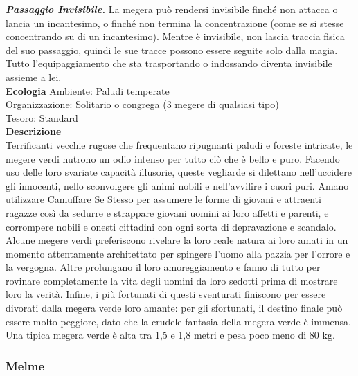 \begin{multicols}{2}
\emph{\textbf{Passaggio Invisibile.}} La megera può rendersi invisibile finché non attacca o lancia un incantesimo, o finché non termina la concentrazione (come se si stesse concentrando su di un incantesimo). Mentre è invisibile, non lascia traccia fisica del suo passaggio, quindi le sue tracce possono essere seguite solo dalla magia. Tutto l'equipaggiamento che sta trasportando o  indossando diventa invisibile assieme a lei.\\
\textbf{Ecologia}
Ambiente: Paludi temperate\\
Organizzazione: Solitario o congrega (3 megere di qualsiasi tipo)\\
Tesoro: Standard\\
\textbf{Descrizione}\\
Terrificanti vecchie rugose che frequentano ripugnanti paludi e foreste intricate, le megere verdi nutrono un odio intenso per tutto ciò che è bello e puro. Facendo uso delle loro svariate capacità illusorie, queste vegliarde si dilettano nell'uccidere gli innocenti, nello sconvolgere gli animi nobili e nell'avvilire i cuori puri. Amano utilizzare Camuffare Se Stesso per assumere le forme di giovani e attraenti ragazze così da sedurre e strappare giovani uomini ai loro affetti e parenti, e corrompere nobili e onesti cittadini con ogni sorta di depravazione e scandalo. Alcune megere verdi preferiscono rivelare la loro reale natura ai loro amati in un momento attentamente architettato per spingere l'uomo alla pazzia per l'orrore e la vergogna. Altre prolungano il loro amoreggiamento e fanno di tutto per rovinare completamente la vita degli uomini da loro sedotti prima di mostrare loro la verità. Infine, i più fortunati di questi sventurati finiscono per essere divorati dalla megera verde loro amante: per gli sfortunati, il destino finale può essere molto peggiore, dato che la crudele fantasia della megera verde è immensa. Una tipica megera verde è alta tra 1,5 e 1,8 metri e pesa poco meno di 80 kg.\\

\subsubsection{Melme}


\end{multicols}
